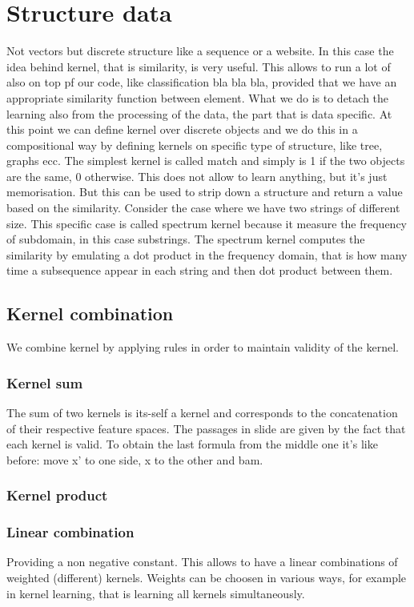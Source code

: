 \section{Structure data}
Not vectors but discrete structure like a sequence or a website. \newline
In this case the idea behind kernel, that is similarity, is very useful. This allows to run a lot of also on top pf our code, like classification bla bla bla, provided that we have an appropriate similarity function between element. What we do is to detach the learning also from the processing of the data, the part that is data specific. At this point we can define kernel over discrete objects and we do this in a compositional way by defining kernels on specific type of structure, like tree, graphs ecc. \newline
The simplest kernel is called match and simply is 1 if the two objects are the same, 0 otherwise. This does not allow to learn anything, but it's just memorisation. But this can be used to strip down a structure and return a value based on the similarity. \newline
Consider the case where we have two strings of different size. This specific case is called spectrum kernel because it measure the frequency of subdomain, in this case substrings. The spectrum kernel computes the similarity by emulating a dot product in the frequency domain, that is how many time a subsequence appear in each string and then dot product between them. \newline
\subsection{Kernel combination}
We combine kernel by applying rules in order to maintain validity of the kernel. 
\subsubsection{Kernel sum}
The sum of two kernels is its-self a kernel and corresponds to the concatenation of their respective feature spaces. The passages in slide are given by the fact that each kernel is valid. To obtain the last formula from the middle one it's like before: move x' to one side, x to the other and bam.  \newline
\subsubsection{Kernel product}
\subsubsection{Linear combination}
Providing a non negative constant. This allows to have a linear combinations of weighted (different) kernels. Weights can be choosen in various ways, for example in kernel learning, that is learning all kernels simultaneously. 
